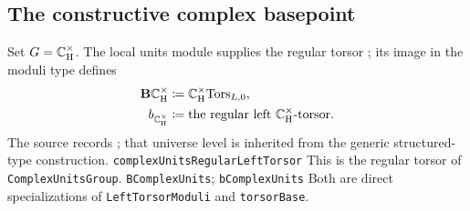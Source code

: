 \subsection{The constructive complex basepoint}
Set $G=\mathbb{C}_{\mathrm H}^{\times}$.  The local units module supplies the regular torsor
; its image in the moduli type defines
\begin{align}
 \mathbf{B}\mathbb{C}_{\mathrm H}^{\times}&\coloneqq\mathbb{C}_{\mathrm H}^{\times}\mathrm{Tors}_{L,0},\\
 b_{\mathbb{C}_{\mathrm H}^{\times}}&\coloneqq\text{the regular left $\mathbb{C}_{\mathrm H}^{\times}$-torsor}.
\end{align}
The source records ; that universe level is
inherited from the generic structured-type construction.
{\texttt{complexUnitsRegularLeftTorsor}}
{This is the regular torsor of \texttt{ComplexUnitsGroup}.}
{\texttt{BComplexUnits}; \texttt{bComplexUnits}}
{Both are direct specializations of \texttt{LeftTorsorModuli} and \texttt{torsorBase}.}

